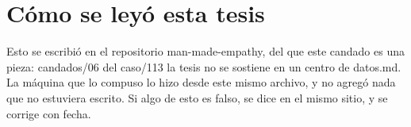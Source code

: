 \documentclass[11pt,a4paper]{article}
\begin{document}
\section*{Cómo se leyó esta tesis}
Esto se escribió en el repositorio man-made-empathy, del que este candado es una pieza: candados/06 del caso/113 la tesis no se sostiene en un centro de datos.md. La máquina que lo compuso lo hizo desde este mismo archivo, y no agregó nada que no estuviera escrito. Si algo de esto es falso, se dice en el mismo sitio, y se corrige con fecha.
\end{document}
